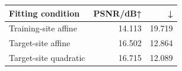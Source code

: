 \begin{tabular}{@{}lrr@{}}
\toprule
Fitting condition & PSNR/dB↑ & \dE{}↓\\
\midrule
Training-site affine & 14.113 & 19.719\\
Target-site affine & 16.502 & 12.864\\
Target-site quadratic & 16.715 & 12.089\\
\bottomrule
\end{tabular}
